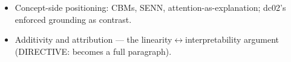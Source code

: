 \begin{itemize}
    \item [TBD] Concept-side positioning: CBMs, SENN, attention-as-explanation; dc02's enforced grounding as contrast.
    \item [TBD] Additivity and attribution — the linearity$\leftrightarrow$interpretability argument (DIRECTIVE: becomes a full paragraph). 

\end{itemize}

